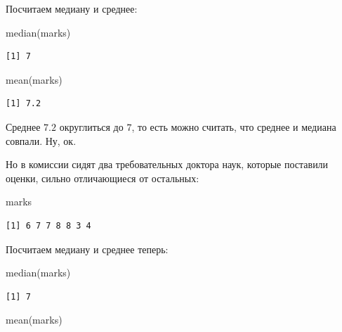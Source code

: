 \documentclass[
  letterpaper,
  DIV=11,
  numbers=noendperiod]{scrreprt}
\newenvironment{Shaded}{}{}
\newcommand{\FunctionTok}[1]{\textcolor[rgb]{0.44,0.26,0.76}{#1}}
\newcommand{\NormalTok}[1]{\textcolor[rgb]{0.14,0.16,0.18}{#1}}
\theoremstyle{definition}
\theoremstyle{remark}
\begin{document}
Посчитаем медиану и среднее:

\begin{Shaded}
\begin{Highlighting}[]
\FunctionTok{median}\NormalTok{(marks)}
\end{Highlighting}
\end{Shaded}

\begin{verbatim}
[1] 7
\end{verbatim}

\begin{Shaded}
\begin{Highlighting}[]
\FunctionTok{mean}\NormalTok{(marks)}
\end{Highlighting}
\end{Shaded}

\begin{verbatim}
[1] 7.2
\end{verbatim}

Среднее \(7.2\) округлиться до \(7\), то есть можно считать, что среднее
и медиана совпали. Ну, ок.

Но в комиссии сидят два требовательных доктора наук, которые поставили
оценки, сильно отличающиеся от остальных:

\begin{Shaded}
\begin{Highlighting}[]
\NormalTok{marks}
\end{Highlighting}
\end{Shaded}

\begin{verbatim}
[1] 6 7 7 8 8 3 4
\end{verbatim}

Посчитаем медиану и среднее теперь:

\begin{Shaded}
\begin{Highlighting}[]
\FunctionTok{median}\NormalTok{(marks)}
\end{Highlighting}
\end{Shaded}

\begin{verbatim}
[1] 7
\end{verbatim}

\begin{Shaded}
\begin{Highlighting}[]
\FunctionTok{mean}\NormalTok{(marks)}
\end{Highlighting}
\end{Shaded}
\end{document}
